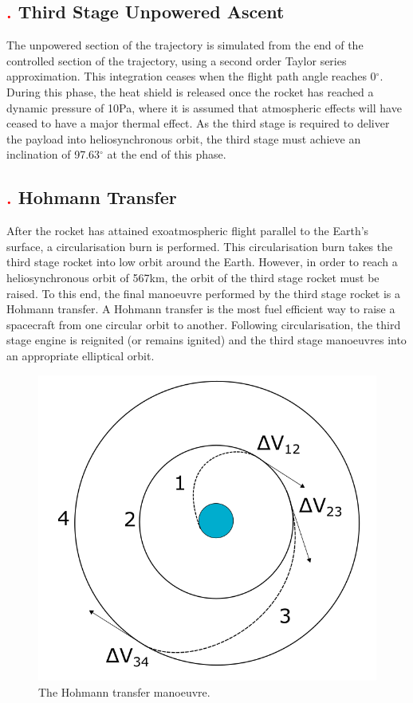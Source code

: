 \subsection{\textcolor{red}{.} Third Stage Unpowered Ascent}

The unpowered section of the trajectory is simulated from the end of the controlled section of the trajectory, using a second order Taylor series approximation. This integration ceases when the flight path angle reaches 0$^{\circ}$.
During this phase, the heat shield is released once the rocket has reached a dynamic pressure of 10Pa, where it is assumed that atmospheric effects will have ceased to have a major thermal effect.  As the third stage is required to deliver the payload into heliosynchronous orbit, the third stage must achieve an inclination of 97.63$^\circ$ at the end of this phase.



\subsection{\textcolor{red}{.} Hohmann Transfer}
After the rocket has attained exoatmospheric flight parallel to the Earth's surface, a circularisation burn is performed. This circularisation burn takes the third stage rocket into low orbit around the Earth. 
However, in order to reach a heliosynchronous orbit of 567km, the orbit of the third stage rocket must be raised. 
To this end, the final manoeuvre performed by the third stage rocket is a Hohmann transfer. A Hohmann transfer is the most fuel efficient way to raise a spacecraft from one circular orbit to another. 
Following circularisation, the third stage engine is reignited (or remains ignited) and the third stage manoeuvres into an appropriate elliptical orbit. 

\begin{figure}
\centering
\includegraphics[width=0.7\linewidth]{figures/4_LODESTAR/Hohmann}
\caption{The Hohmann transfer manoeuvre.}
\label{fig:Hohmann}
\end{figure}





